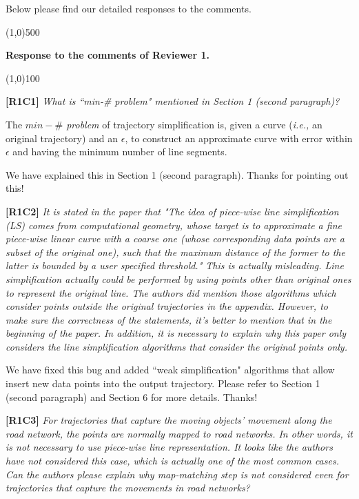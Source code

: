 \documentclass{letter}
\newcommand{\ie}{\emph{i.e.,}\xspace}
\begin{document}
Below please find our detailed responses to the comments.



\line(1,0){500}

\textbf{Response to the comments of Reviewer 1.}

\line(1,0){100}


\textbf{[R1C1]} \emph{What is ``min-\# problem" mentioned in Section 1 (second paragraph)?}

The \emph{$min-\#$ problem} of trajectory simplification is, given a curve (\ie an original trajectory) and an $\epsilon$, to construct an approximate curve with error within $\epsilon$ and having the minimum number of line segments.

We have explained this in Section 1 (second paragraph). Thanks for pointing out this!

\textbf{[R1C2]} \emph{It is stated in the paper that "The idea of piece-wise line simplification (LS) comes from computational geometry, whose target is to approximate a fine piece-wise linear curve with a coarse one (whose corresponding data points are a subset of the original one), such that the maximum distance of the former to the latter is bounded by a user specified threshold." This is actually misleading. Line simplification actually could be performed by using points other than original ones to represent the original line. The authors did mention those algorithms which consider points outside the original trajectories in the appendix. However, to make sure the correctness of the statements, it's better to mention that in the beginning of the paper. In addition, it is necessary to explain why this paper only considers the line simplification algorithms that consider the original points only. }

We have fixed this bug and added ``weak simplification" algorithms that allow insert new data points into the output trajectory. Please refer to Section 1 (second paragraph) and Section 6 for more details.
Thanks!

\textbf{[R1C3]} \emph{ For trajectories that capture the moving objects' movement along the road network, the points are normally mapped to road networks. In other words, it is not necessary to use piece-wise line representation. It looks like the authors have not considered this case, which is actually one of the most common cases. Can the authors please explain why map-matching step is not considered even for trajectories that capture the movements in road networks? }
\end{document}
